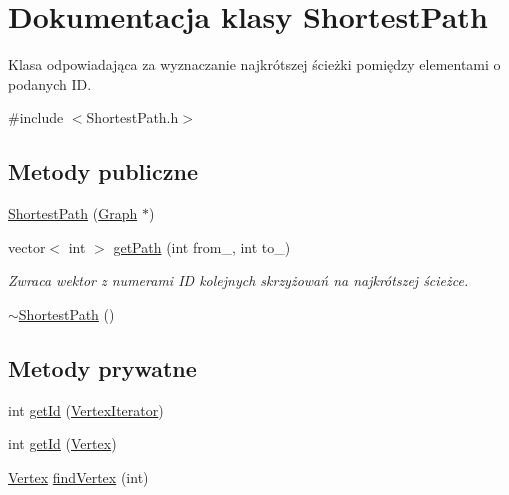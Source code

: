 \hypertarget{class_shortest_path}{\section{Dokumentacja klasy Shortest\-Path}
\label{class_shortest_path}
}


Klasa odpowiadająca za wyznaczanie najkrótszej ścieżki pomiędzy elementami o podanych I\-D.  




{\ttfamily \#include $<$Shortest\-Path.\-h$>$}

\subsection*{Metody publiczne}
\begin{DoxyCompactItemize}
\item 
\hyperlink{class_shortest_path_a25347cb0bbdb5caaad9f3ca9e0ef0d25}{Shortest\-Path} (\hyperlink{_types_8h_adb8cbccb1bf63dda03515e30e185c388}{Graph} $\ast$)
\item 
vector$<$ int $>$ \hyperlink{class_shortest_path_ad9c6dccde6b27fa1d7c1db57d9e67bfd}{get\-Path} (int from\-\_\-, int to\-\_\-)
\begin{DoxyCompactList}\small\item\em Zwraca wektor z numerami I\-D kolejnych skrzyżowań na najkrótszej ścieżce. \end{DoxyCompactList}\item 
\hyperlink{class_shortest_path_a5538d38c856b9836b4ab6b6881b2fca7}{$\sim$\-Shortest\-Path} ()
\end{DoxyCompactItemize}
\subsection*{Metody prywatne}
\begin{DoxyCompactItemize}
\item 
int \hyperlink{class_shortest_path_a4b137fbbd761ff28873a1b00c6b5055e}{get\-Id} (\hyperlink{_map_factory_8cpp_ae6603b1d73e6c4cf70f33b356e8d591c}{Vertex\-Iterator})
\item 
int \hyperlink{class_shortest_path_af25f1dff91ed0fa22e5d6c3cd4653085}{get\-Id} (\hyperlink{_types_8h_a8c93f604acf57e6a9bae1f91c379ac98}{Vertex})
\item 
\hyperlink{_types_8h_a8c93f604acf57e6a9bae1f91c379ac98}{Vertex} \hyperlink{class_shortest_path_a80f9815e7c4e13f7b125d93955c0538c}{find\-Vertex} (int)
\end{DoxyCompactItemize}
